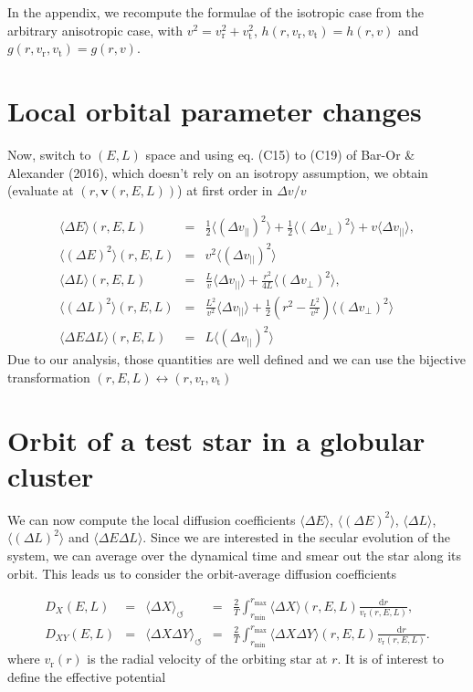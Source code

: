 \documentclass[11pt]{article}
\newcommand{\rt}{\mathrm{t}}
\newcommand{\rr}{\mathrm{r}}
\newcommand{\rd}{{\mathrm{d}}}
\newcommand{\vr}{v_{\rr}}
\newcommand{\vt}{v_{\rt}}
\newcommand{\rmax}{r_{\max}}
\newcommand{\rmin}{r_{\min}}
\newcommand{\bv}{\boldsymbol{v}}
\newcommand{\dvPar}{\Delta v_{||}}
\newcommand{\dvPerp}{\Delta v_{\perp}}
\newcommand{\dvParAvrLoc}{\langle \dvPar \rangle}
\newcommand{\dvParSqAvrLoc}{\langle(\dvPar)^{2}\rangle}
\newcommand{\dvPerpSqAvrLoc}{\langle(\dvPerp)^{2}\rangle}
\newcommand{\Dv}{\Delta v}
\newcommand{\DE}{\Delta E}
\newcommand{\DL}{\Delta L}
\newcommand{\DEAvr}{\langle\DE\rangle}
\newcommand{\DESqAvr}{\langle (\DE)^{2} \rangle}
\newcommand{\DLAvr}{\langle\DL\rangle}
\newcommand{\DLSqAvr}{\langle (\DL)^{2} \rangle}
\newcommand{\DEDLAvr}{\langle \DE \DL \rangle}
\newcommand{\DXAvr}{\langle\Delta X\rangle}
\newcommand{\DXYAvr}{\langle\Delta X \Delta Y\rangle}
\newcommand{\dX}{D_{X}}
\newcommand{\dXY}{D_{XY}}
\begin{document}
In the appendix, we recompute the formulae of the isotropic case from
the arbitrary anisotropic case, with $v^{2}=\vr^{2}+\vt^{2}$,
$h(r,\vr,\vt)=h(r,v)$ and $g(r,\vr,\vt)=g(r,v)$.

\section{Local orbital parameter changes}
\label{sec:Local_dE_dL}

Now, switch to $(E,L)$ space and using eq. (C15) to (C19) of Bar-Or
\& Alexander (2016), which doesn't rely on an isotropy assumption,
we obtain (evaluate at $(r,\bv(r,E,L))$) at first order
in $\Dv/v$

\begin{equation}
\begin{array}{ccl}
 \DEAvr(r,E,L) & =&\displaystyle{\frac{1}{2}\dvParSqAvrLoc+\frac{1}{2}\dvPerpSqAvrLoc+v\dvParAvrLoc} ,\\
  
 \DESqAvr(r,E,L) & = &\displaystyle{v^{2}\dvParSqAvrLoc}\\
  \DLAvr(r,E,L) & =&\displaystyle{\frac{L}{v}\dvParAvrLoc+\frac{r^{2}}{4L}\dvPerpSqAvrLoc} ,\\
  
  \DLSqAvr(r,E,L) & = &\displaystyle{\frac{L^{2}}{v^{2}}\dvParAvrLoc+\frac{1}{2}\left(r^{2}-\frac{L^{2}}{v^{2}}\right)\dvPerpSqAvrLoc}\\
  
  \DEDLAvr(r,E,L) & = &\displaystyle{L \dvParSqAvrLoc}   
\end{array}
\label{eq:DE_DL}
\end{equation}
Due to our analysis, those quantities are well defined and
we can use the bijective transformation $(r,E,L)\leftrightarrow(r,\vr,\vt)$

\section{Orbit of a test star in a globular cluster}
\label{sec:Orbit_globular_cluster}

We can now compute the local diffusion coefficients $\DEAvr$,
$\DESqAvr$, $\DLAvr$,
$\DLSqAvr$ and $\DEDLAvr$.
Since we are interested in the secular evolution of the system, we
can average over the dynamical time and smear out the star along its
orbit. This leads us to consider the orbit-average diffusion coefficients

\begin{equation}
\begin{array}{cclcl}
 \dX(E,L) & =& \DXAvr_{\leftturn} & =&\displaystyle{\frac{2}{T}\int_{\rmin}^{\rmax}\DXAvr(r,E,L)\frac{{\rd}r}{\vr(r,E,L)}} ,\\
  
  \dXY(E,L) & =& \DXYAvr_{\leftturn} & =&\displaystyle{\frac{2}{T}\int_{\rmin}^{\rmax}\DXYAvr(r,E,L)\frac{{\rd}r}{\vr(r,E,L)}} .
\end{array}
\label{eq:DE_DL}
\end{equation}
where $\vr(r)$ is the radial velocity of the orbiting star at $r$. It is of interest to define the effective potential
\end{document}
